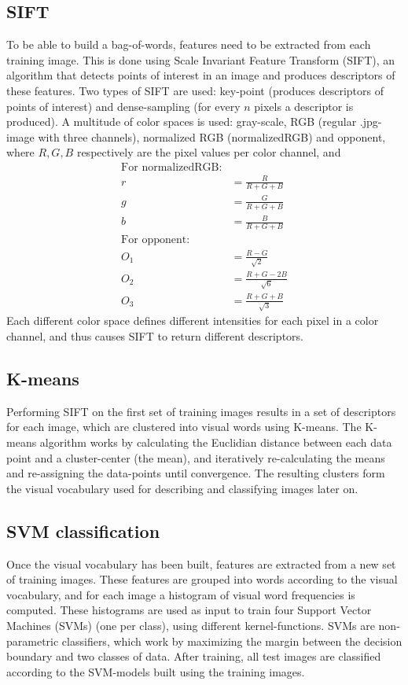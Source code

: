 \documentclass{article} %
\begin{document}
\subsection{SIFT}
To be able to build a bag-of-words, features need to be extracted from each training image. This is done using Scale Invariant Feature Transform (SIFT), an algorithm that detects points of interest in an image and produces descriptors of these features. Two types of SIFT are used: key-point (produces descriptors of points of interest) and dense-sampling (for every $n$ pixels a descriptor is produced). A multitude of color spaces is used: gray-scale, RGB (regular .jpg-image with three channels), normalized RGB (normalizedRGB) and opponent, where $R,G,B$ respectively are the pixel values per color channel, and
\begin{align*}
\text{For normalizedRGB:}\\
r&= \frac{R}{R+G+B}\\
g&=\frac{G}{R+G+B} \\
b&= \frac{B}{R+G+B}\\
\text{For opponent:}\\
O_1&= \frac{R-G}{\sqrt{2}}\\
O_2&= \frac{R+G-2B}{\sqrt{6}}\\
O_3&= \frac{R+G+B}{\sqrt{3}}
\end{align*}
Each different color space defines different intensities for each pixel in a color channel, and thus causes SIFT to return different descriptors.
\subsection{K-means}
Performing SIFT on the first set of training images results in a set of descriptors for each image, which are clustered into visual words using K-means. The K-means algorithm works by calculating the Euclidian distance between each data point and a cluster-center (the mean), and iteratively re-calculating the means and re-assigning the data-points until convergence. The resulting clusters form the visual vocabulary used for describing and classifying images later on. 
\subsection{SVM classification}
Once the visual vocabulary has been built, features are extracted from a new set of training images. These features are grouped into words according to the visual vocabulary, and for each image a histogram of visual word frequencies is computed.
These histograms are used as input to train four Support Vector Machines (SVMs) (one per class), using different kernel-functions. SVMs are non-parametric classifiers, which work by maximizing the margin between the decision boundary and two classes of data.
After training, all test images are classified according to the SVM-models built using the training images. 
\end{document}
